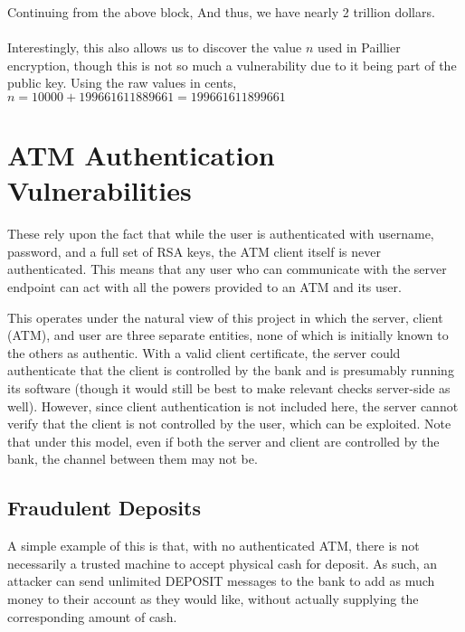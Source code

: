 \documentclass{article}
\begin{document}
Continuing from the above block,
And thus, we have nearly 2 trillion dollars. \\
\\
Interestingly, this also allows us to discover the value $n$ used in Paillier encryption, though this is not so much a vulnerability due to it being part of the public key. Using the raw values in cents, $n = 10000 + 199661611889661 = 199661611899661$

\section{ATM Authentication Vulnerabilities}
These rely upon the fact that while the user is authenticated with username, password, and a full set of RSA keys, the ATM client itself is never authenticated. This means that any user who can communicate with the server endpoint can act with all the powers provided to an ATM and its user.

This operates under the natural view of this project in which the server, client (ATM), and user are three separate entities, none of which is initially known to the others as authentic. With a valid client certificate, the server could authenticate that the client is controlled by the bank and is presumably running its software (though it would still be best to make relevant checks server-side as well). However, since client authentication is not included here, the server cannot verify that the client is not controlled by the user, which can be exploited. Note that under this model, even if both the server and client are controlled by the bank, the channel between them may not be.

\subsection{Fraudulent Deposits}
A simple example of this is that, with no authenticated ATM, there is not necessarily a trusted machine to accept physical cash for deposit. As such, an attacker can send unlimited DEPOSIT messages to the bank to add as much money to their account as they would like, without actually supplying the corresponding amount of cash.
\end{document}

